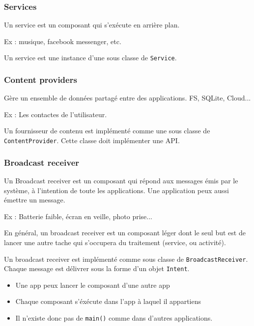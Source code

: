 \documentclass{beamer}
\begin{document}
\begin{frame}
\frametitle{Services}
\begin{block}{}
Un service est un composant qui s’exécute en arrière plan.

Ex : musique, facebook messenger, etc.
\end{block}

\begin{block}{}
Un service est une instance d'une sous classe de \verb!Service!.
\end{block}
\end{frame}

\begin{frame}
\frametitle{Content providers}
\begin{block}{}
Gère un ensemble de données partagé entre des applications. FS, SQLite, Cloud...

Ex : Les contactes de l'utilisateur.
\end{block}

\begin{block}{}
Un fournisseur de contenu  est implémenté comme une sous classe de \verb!ContentProvider!. Cette classe doit implémenter une API.
\end{block}
\end{frame}

\begin{frame}
\frametitle{Broadcast receiver}
\begin{block}{}
Un Broadcast receiver est un composant qui répond aux messages émis par le système, à l'intention de toute les applications. Une application peux aussi émettre un message.

Ex : Batterie faible, écran en veille, photo prise...
\end{block}

\begin{block}{}
En général, un broadcast receiver est un composant léger dont le seul but est de lancer une autre tache qui s'occupera du traitement (service, ou activité).
\end{block}

\begin{block}{}
Un broadcast receiver est implémenté comme sous classe de \verb!BroadcastReceiver!. Chaque message est délivrer sous la forme d'un objet \verb!Intent!.
\end{block}
\end{frame}

\begin{frame}
\begin{itemize}
\item Une app peux lancer le composant d'une autre app
\item Chaque composant s'éxécute dans l'app à laquel il appartiens
\item Il n'existe donc pas de \verb!main()! comme dans d'autres applications.
\end{itemize}

\end{frame}
\end{document}
